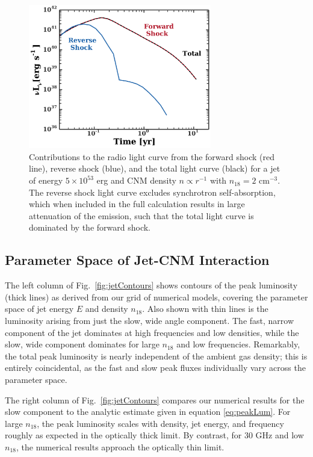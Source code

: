 \documentclass[usenatbib,fleqn]{mnras}
\begin{document}
\begin{figure}
  \includegraphics[width=8cm]{reverse.pdf}
  \caption{\label{fig:reverse} Contributions to the radio light curve
    from the forward shock (red line), reverse shock (blue), and the
    total light curve (black) for a jet of energy $5\times 10^{53}$
    erg and CNM density $n\propto r^{-1}$ with $n_{18} = 2$ cm$^{-3}$.
    The reverse shock light curve excludes synchrotron
    self-absorption, which when included in the full calculation
    results in large attenuation of the emission, such that the total
    light curve is dominated by the forward shock.}
\end{figure}

\subsection{Parameter Space of Jet-CNM Interaction}
\label{sec:param}
The left column of Fig.~\ref{fig:jetContours} shows contours of the
peak luminosity (thick lines) as derived from our grid of numerical
models, covering the parameter space of jet energy $E$ and density
$n_{18}$.  Also shown with thin lines is the luminosity arising from
just the slow, wide angle component.  The fast, narrow component of
the jet dominates at high frequencies and low densities, while the
slow, wide component dominates for large $n_{18}$ and low frequencies.
Remarkably, the total peak luminosity is nearly independent of the
ambient gas density; this is entirely coincidental, as the fast and
slow peak fluxes individually vary across the parameter space.

The right column of Fig.~\ref{fig:jetContours} compares our numerical
results for the slow component to the analytic estimate given in
equation \eqref{eq:peakLum}.  For large $n_{18}$, the peak luminosity
scales with density, jet energy, and frequency roughly as expected in
the optically thick limit.  By contrast, for 30 GHz and low $n_{18}$,
the numerical results approach the optically thin limit.
\end{document}
